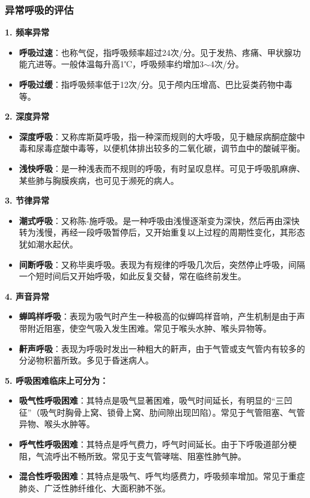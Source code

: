 \documentclass[11pt, a4paper]{ctexart}
\begin{document}
\subsubsection{异常呼吸的评估}
\textbf{1. 频率异常}
\begin{itemize}
	\item \textbf{呼吸过速}：也称气促，指呼吸频率超过24次/分。见于发热、疼痛、甲状腺功能亢进等。一般体温每升高1℃，呼吸频率约增加3$\sim$4次/分。
	\item \textbf{呼吸过缓}：指呼吸频率低于12次/分。见于颅内压增高、巴比妥类药物中毒等。
\end{itemize}
\textbf{2. 深度异常}
\begin{itemize}
	\item \textbf{深度呼吸}：又称库斯莫呼吸，指一种深而规则的大呼吸，见于糖尿病酮症酸中毒和尿毒症酸中毒等，以便机体排出较多的二氧化碳，调节血中的酸碱平衡。
	\item \textbf{浅快呼吸}：是一种浅表而不规则的呼吸，有时呈叹息样。可见于呼吸肌麻痹、某些肺与胸膜疾病，也可见于濒死的病人。
\end{itemize}
\textbf{3. 节律异常}
\begin{itemize}
	\item \textbf{潮式呼吸}：又称陈-施呼吸。是一种呼吸由浅慢逐渐变为深快，然后再由深快转为浅慢，再经一段呼吸暂停后，又开始重复以上过程的周期性变化，其形态犹如潮水起伏。
	\item \textbf{间断呼吸}：又称毕奥呼吸。表现为有规律的呼吸几次后，突然停止呼吸，间隔一个短时间后又开始呼吸，如此反复交替，常在临终前发生。
\end{itemize}
\textbf{4. 声音异常}
\begin{itemize}
	\item \textbf{蝉鸣样呼吸}：表现为吸气时产生一种极高的似蝉鸣样音响，产生机制是由于声带附近阻塞，使空气吸入发生困难。常见于喉头水肿、喉头异物等。
	\item \textbf{鼾声呼吸}：表现为呼吸时发出一种粗大的鼾声，由于气管或支气管内有较多的分泌物积蓄所致。多见于昏迷病人。
\end{itemize}
\textbf{5. 呼吸困难临床上可分为：}
\begin{itemize}
	\item \textbf{吸气性呼吸困难}：其特点是吸气显著困难，吸气时间延长，有明显的“三凹征”（吸气时胸骨上窝、锁骨上窝、肋间隙出现凹陷）。常见于气管阻塞、气管异物、喉头水肿等。
	\item \textbf{呼气性呼吸困难}：其特点是呼气费力，呼气时间延长。由于下呼吸道部分梗阻，气流呼出不畅所致。常见于支气管哮喘、阻塞性肺气肿。
	\item \textbf{混合性呼吸困难}：其特点是吸气、呼气均感费力，呼吸频率增加。常见于重症肺炎、广泛性肺纤维化、大面积肺不张。
\end{itemize}
\end{document}

